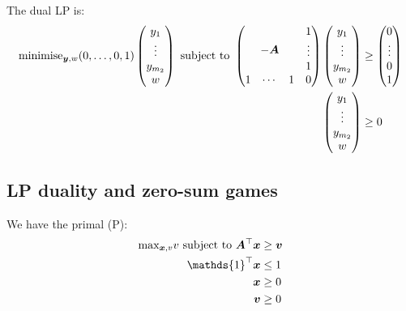 	The dual LP is:
	\begin{equation}
		\begin{split}
			\text{minimise}_{\vect{y},w}
			(0,\ldots,0,1) \begin{pmatrix}
				y_1 \\
				\vdots \\
				y_{m_2} \\
				w
			\end{pmatrix}
			\text{ subject to }
			\begin{pmatrix}
				& & & 1 \\
				& & & \vdots  \\
				\multicolumn{3}{c}
				{\raisebox{\dimexpr\normalbaselineskip+.7\ht\strutbox-.5\height}[0pt][0pt]
				{{$-\vect{A}$}}} & 1 \\
				1 & \cdots & 1 & 0
			\end{pmatrix} \begin{pmatrix}
				y_1 \\
				\vdots \\
				y_{m_2} \\
				w
			\end{pmatrix} & \ge \begin{pmatrix}
				0 \\
				\vdots \\
				0 \\
				1
			\end{pmatrix} \\
			\begin{pmatrix}
				y_1 \\
				\vdots \\
				y_{m_2} \\
				w
			\end{pmatrix} & \ge 0
		\end{split} 
	\end{equation}

\subsection{LP duality and zero-sum games}
	We have the primal (P):
	\begin{equation}
		\begin{split}
			\text{max}_{\vect{x}, v} v \text{ subject to }
			\vect{A}^\top \vect{x} & \ge \vect{v} \\
			\mathds{1}^\top \vect{x} & \le 1 \\
			\vect{x} & \ge 0 \\
			\vect{v} & \ge 0
		\end{split}
	\end{equation}

